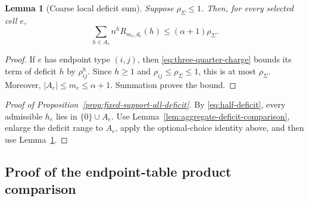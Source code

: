 \documentclass[a4paper,10pt,reqno]{amsart}
\numberwithin{equation}{section}
\theoremstyle{plain}
\newtheorem{lemma}[theorem]{Lemma}
\theoremstyle{remark}
\begin{document}
\begin{lemma}[Coarse local deficit sum]
\label{lem:coarse-local-deficit-sum}
Suppose $\rho_{\Sigma}\le1$. Then, for every selected cell $e$,
\[
  \sum_{h\in A_e}n^hR_{m_e,d_e}(h)
  \le
  (\alpha+1)\rho_{\Sigma}.
\]
\end{lemma}

\begin{proof}
If $e$ has endpoint type $(i,j)$, then
\eqref{eq:three-quarter-charge} bounds its term of deficit $h$ by
$\rho_{ij}^h$. Since $h\ge1$ and
$\rho_{ij}\le\rho_{\Sigma}\le1$, this is at most $\rho_{\Sigma}$. Moreover,
$|A_e|\le m_e\le\alpha+1$. Summation proves the bound.
\end{proof}

\begin{proof}[Proof of Proposition~\ref{prop:fixed-support-all-deficit}]
By \eqref{eq:half-deficit}, every admissible $h_e$ lies in $\{0\}\cup A_e$.
Use Lemma~\ref{lem:aggregate-deficit-comparison}, enlarge the deficit range
to $A_e$, apply the optional-choice identity above, and then use
Lemma~\ref{lem:coarse-local-deficit-sum}.
\end{proof}

\subsection{Proof of the endpoint-table product comparison}
\label{app:endpoint-comparison-proof}
\end{document}
